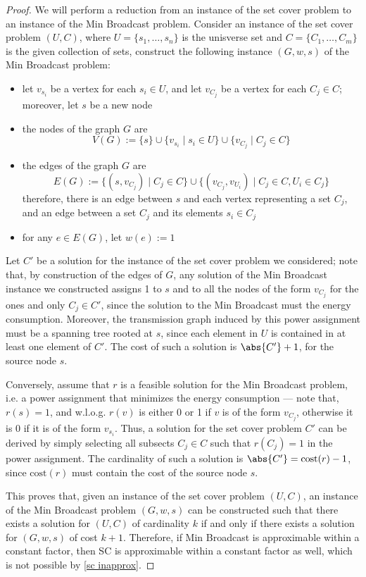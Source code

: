 \documentclass[a4paper, 12pt]{report}
\begin{document}
    \begin{proof}
        We will perform a reduction from an instance of the set cover problem to an instance of the Min Broadcast problem. Consider an instance of the set cover problem $(U, C)$, where $U = \{s_1, \ldots, s_n\}$ is the unisverse set and $C = \{C_1, \ldots, C_m\}$ is the given collection of sets, construct the following instance $(G, w, s)$ of the Min Broadcast problem:

        \begin{itemize}
            \item let $v_{s_i}$ be a vertex for each $s_i \in U$, and let $v_{C_j}$ be a vertex for each $C_j \in C$; moreover, let $s$ be a new node
            \item the nodes of the graph $G$ are $$V(G) := \{s\} \cup \{v_{s_i} \mid s_i \in U\} \cup \{v_{C_j} \mid C_j \in C\}$$
            \item the edges of the  graph $G$ are $$E(G) := \{(s, v_{C_j}) \mid C_j \in C\} \cup \{(v_{C_j}, v_{U_i}) \mid C_j \in C, U_i \in C_j\}$$ therefore, there is an edge between $s$ and each vertex representing a set $C_j$, and an edge between a set $C_j$ and its elements $s_i \in C_j$
            \item for any $e \in E(G)$, let $w(e) := 1$
        \end{itemize}
        
        Let $C'$ be a solution for the instance of the set cover problem we considered; note that, by construction of the edges of $G$, any solution of the Min Broadcast instance we constructed assigns 1 to $s$ and to all the nodes of the form $v_{C_j}$ for the ones and only $C_j \in C'$, since the solution to the Min Broadcast must  the energy consumption. Moreover, the transmission graph induced by this power assignment must be a spanning tree rooted at $s$, since each element in $U$ is contained in at least one element of $C'$. The cost of such a solution is $\abs{C'} + 1$, for the source node $s$.

        Conversely, assume that $r$ is a feasible solution for the Min Broadcast problem, i.e. a power assignment that minimizes the energy consumption --- note that, $r(s) = 1$, and w.l.o.g. $r(v)$ is either 0 or 1 if $v$ is of the form $v_{C_j}$, otherwise it is 0 if it is of the form $v_{s_i}$. Thus, a solution for the set cover problem $C'$ can be derived by simply selecting all subsects $C_j \in C$ such that $r(C_j) = 1$ in the power assignment. The cardinality of such a solution is $\abs{C'} = \mathrm{cost}(r) - 1$, since $\mathrm{cost}(r)$ must contain the cost of the source node $s$.

        This proves that, given an instance of the set cover problem $(U, C)$, an instance of the Min Broadcast problem $(G, w, s)$ can be constructed such that there exists a solution for $(U, C)$ of cardinality $k$ if and only if there exists a solution for $(G, w, s)$ of cost $k + 1$. Therefore, if Min Broadcast is approximable within a constant factor, then SC is approximable within a constant factor as well, which is not possible by \cref{sc inapprox}.
    \end{proof}
\end{document}
